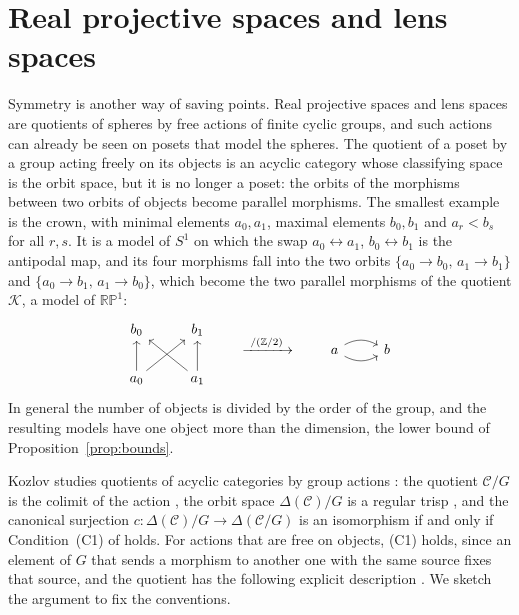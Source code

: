 \documentclass[12pt]{amsart}
\theoremstyle{definition}
\theoremstyle{remark}
\newcommand{\CC}{\mathcal{C}}
\newcommand{\co}{\colon}
\newcommand{\Z}{\mathbb{Z}}
\newcommand{\K}{\mathcal{K}}
\newcommand{\RP}{\mathbb{RP}}
\newcommand{\nerve}{\Delta}
\begin{document}
\section{Real projective spaces and lens spaces}\label{sec:projective}

Symmetry is another way of saving points. Real projective spaces and lens spaces are quotients of spheres by free actions of finite cyclic groups, and such actions can already be seen on posets that model the spheres. The quotient of a poset by a group acting freely on its objects is an acyclic category whose classifying space is the orbit space, but it is no longer a poset: the orbits of the morphisms between two orbits of objects become parallel morphisms. The smallest example is the crown, with minimal elements $a_0,a_1$, maximal elements $b_0,b_1$ and $a_r<b_s$ for all $r,s$. It is a model of $S^1$ on which the swap $a_0\leftrightarrow a_1$, $b_0\leftrightarrow b_1$ is the antipodal map, and its four morphisms fall into the two orbits $\{a_0\to b_0,\,a_1\to b_1\}$ and $\{a_0\to b_1,\,a_1\to b_0\}$, which become the two parallel morphisms of the quotient $\K$, a model of $\RP^1$:
\[
\begin{tikzcd}[column sep=2.5em, row sep=2.2em]
b_0 & b_1 \\
a_0 \arrow[u] \arrow[ur] & a_1 \arrow[u] \arrow[ul]
\end{tikzcd}
\qquad\xrightarrow{\ /(\Z/2)\ }\qquad
\begin{tikzcd}
a \arrow[r, bend left] \arrow[r, bend right] & b
\end{tikzcd}
\]
In general the number of objects is divided by the order of the group, and the resulting models have one object more than the dimension, the lower bound of Proposition~\ref{prop:bounds}.

Kozlov studies quotients of acyclic categories by group actions \cite[Chapter~14]{Kozlov2008}: the quotient $\CC/G$ is the colimit of the action \cite[Definition~14.8]{Kozlov2008}, the orbit space $\nerve(\CC)/G$ is a regular trisp \cite[Proposition~14.4, (14.1)]{Kozlov2008}, and the canonical surjection $c\co\nerve(\CC)/G\to\nerve(\CC/G)$ is an isomorphism if and only if Condition~(C1) of \cite[Theorem~14.14]{Kozlov2008} holds. For actions that are free on objects, (C1) holds, since an element of $G$ that sends a morphism to another one with the same source fixes that source, and the quotient has the following explicit description \cite[Proposition~14.13]{Kozlov2008}. We sketch the argument to fix the conventions.
\end{document}
